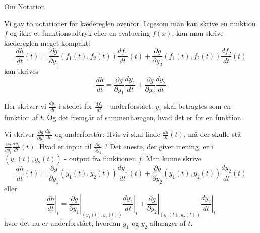 \documentclass[a4paper, 12pt]{article}
\theoremstyle{remark}
\begin{document}
\begin{tcolorbox}
\begin{center}Om Notation\end{center}
Vi gav to notationer for kædereglen ovenfor. Ligesom man kan skrive en funktion $f$ og ikke et funktionsudtryk eller en evaluering $f(x)$, kan man skrive kædereglen meget kompakt: 
$$\frac{dh}{dt}(t)=\frac{\partial g}{\partial y_1}(f_1(t),f_2(t))\frac{df_1}{dt}(t)+\frac{\partial g}{\partial y_2}(f_1(t),f_2(t))\frac{df_2}{dt}(t)$$ kan skrives 
 $$\frac{dh}{dt}=\frac{\partial g}{\partial y_1}\frac{dy_1}{dt}+\frac{\partial g}{\partial y_2}\frac{dy_2}{dt}$$

Her skriver vi $\frac{dy_1}{dt}$ i stedet for $\frac{df_1}{dt}$ - underforstået: $y_1$ skal betragtes som en funktion af $t$. Og det fremgår af sammenhængen, hvad det er for en funktion.

Vi skriver $\frac{\partial g}{\partial y_1}\frac{dy_1}{dt}$ og underforstår: Hvis vi skal finde $\frac{dh}{dt}(t)$, må der skulle stå  $\frac{\partial g}{\partial y_1}\frac{dy_1}{dt}(t)$. Hvad er input til  $\frac{\partial g}{\partial y_1}$ ? Det eneste, der giver mening, er i $(y_1(t), y_2(t))$ - output fra funktionen $f$. Man kunne skrive 
$$\frac{dh}{dt}(t)=\frac{\partial g}{\partial y_1}(y_1(t),y_2(t))\frac{dy_1}{dt}(t)+\frac{\partial g}{\partial y_2}(y_1(t),y_2(t))\frac{dy_2}{dt}(t)$$ 
eller
$$\left.\frac{dh}{dt}\right\vert_t=\left.\frac{\partial g}{\partial y_1}\right\vert_{(y_1(t),y_2(t))}\left.\frac{dy_1}{dt}\right\vert_t+\left.\frac{\partial g}{\partial y_2}\right\vert_{(y_1(t),y_2(t))}\left.\frac{dy_2}{dt}\right\vert_t$$
hvor det nu er underforstået, hvordan $y_1$ og $y_2$ afhænger af $t$.

\end{tcolorbox}
\end{document}
